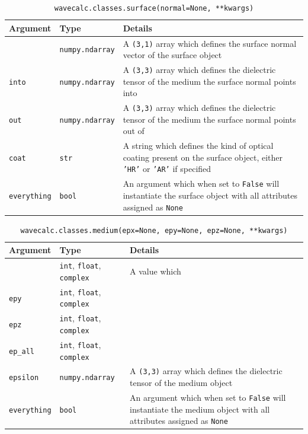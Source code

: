 \documentclass[11pt, reqno]{book}%
\newcounter{ct}
\newcommand{\tw}[1]{{\tt #1}}
\begin{document}
\begin{table}[ht]
\begin{center}
\caption*{\tw{wavecalc.classes.surface(normal=None, **kwargs)}}
\begin{tabular}{>{\centering\arraybackslash}m{3.5cm}|>{\centering\arraybackslash}m{3.5cm}|>{\arraybackslash}m{6.5cm}}
\hline
 \textbf{Argument} & \textbf{Type} & \textbf{Details} \\
 \hline
 \tw{normal} & \tw{numpy.ndarray} & A \tw{(3,1)} array which defines the surface normal vector of the surface object \\
 \hline
 \tw{into} & \tw{numpy.ndarray} & A \tw{(3,3)} array which defines the dielectric tensor of the medium the surface normal points into\\
 \hline
  \tw{out} & \tw{numpy.ndarray} & A \tw{(3,3)} array which defines the dielectric tensor of the medium the surface normal points out of \\
 \hline
  \tw{coat} & \tw{str} & A string which defines the kind of optical coating present on the surface object, either \tw{'HR'} or \tw{'AR'} if specified\\
 \hline
 \tw{everything} & \tw{bool} & An argument which when set to \tw{False} will instantiate the surface object with all attributes assigned as \tw{None} \\
 \hline
\end{tabular}
\label{tab:surfcheatsheet}
\end{center}
\end{table}




\begin{table}[ht]
\begin{center}
\caption*{\tw{wavecalc.classes.medium(epx=None, epy=None, epz=None, **kwargs)}}
\begin{tabular}{>{\centering\arraybackslash}m{3.5cm}|>{\centering\arraybackslash}m{3.5cm}|>{\arraybackslash}m{6.5cm}}
\hline
 \textbf{Argument} & \textbf{Type} & \textbf{Details} \\
 \hline
 \tw{epx} & \tw{int}, \tw{float}, \tw{complex} & A value which  \\
 \hline
 \tw{epy} & \tw{int}, \tw{float}, \tw{complex} & \\
 \hline
  \tw{epz} & \tw{int}, \tw{float}, \tw{complex}&  \\
 \hline
  \tw{ep\_all} & \tw{int}, \tw{float}, \tw{complex} & \\
 \hline
  \tw{epsilon} & \tw{numpy.ndarray} & A \tw{(3,3)} array which defines the dielectric tensor of the medium object \\
 \hline
 \tw{everything} & \tw{bool} & An argument which when set to \tw{False} will instantiate the medium object with all attributes assigned as \tw{None} \\
 \hline
\end{tabular}
\label{tab:medcheatsheet}
\end{center}
\end{table}
\end{document}
